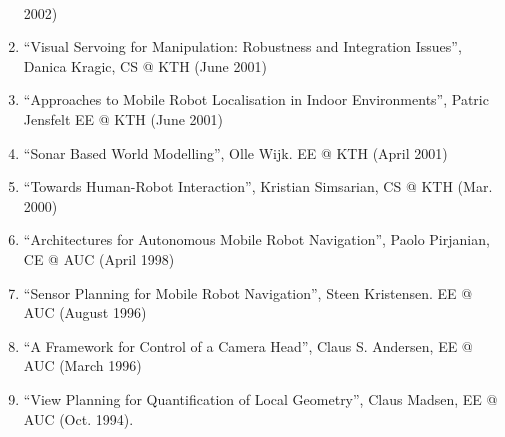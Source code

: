 \documentclass{article}
\begin{document}
\begin{cv}
\begin{cvlist}{~}
\begin{enumerate}
			      2002)
			\item ``Visual Servoing for Manipulation: Robustness and Integration
			      Issues'', Danica Kragic, CS @ KTH (June 2001)
			\item ``Approaches to Mobile Robot Localisation in Indoor Environments'',
			      Patric Jensfelt EE @ KTH (June 2001)
			\item ``Sonar Based World Modelling'', Olle Wijk. EE @ KTH (April 2001)
			\item ``Towards Human-Robot Interaction'', Kristian Simsarian, CS @ KTH
			      (Mar. 2000)
			\item ``Architectures for Autonomous Mobile Robot Navigation'', Paolo
			      Pirjanian, CE @ AUC (April 1998)
			\item ``Sensor Planning for Mobile Robot Navigation'', Steen Kristensen. EE
			      @ AUC (August 1996)
			\item ``A Framework for Control of a Camera Head'', Claus S. Andersen, EE @
			      AUC (March 1996)
			\item ``View Planning for Quantification of Local Geometry'', Claus Madsen,
			      EE @ AUC (Oct. 1994).
		\end{enumerate}


\end{cvlist}
\end{cv}
\end{document}
